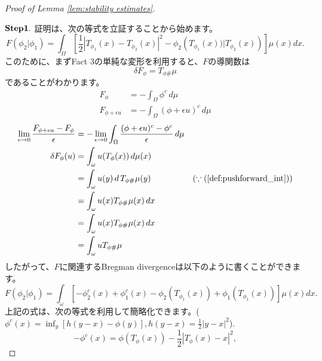 \documentclass{jsarticle}
\theoremstyle{definition}
\begin{document}
\begin{proof}[Proof of Lemma \ref{lem:stability estimates}]
  \hypertarget{proof:lem:stability estimates}{}

  $\bold{Step 1.}$
  証明は、次の等式を立証することから始めます。
  \begin{equation}
    \label{eq:F(phi2|phi1)}
    F(\phi_2 | \phi_1) = \int_{\Omega} \left[\frac{1}{2} \left| T_{\phi_1}(x) - T_{\phi_2}(x) \right|^2 - \phi_2\left( T_{\phi_1}(x)) |T_{\phi_2}(x)\right) \right] \mu(x)dx.
  \end{equation}
  このために、まずFact 3の単純な変形を利用すると、$F$の導関数は
  \begin{equation}
    \label{eq:delta F}
    \delta F_\phi = T_{\phi \#} \mu
  \end{equation}  
  であることがわかります。
  \begin{align*}
    F_\phi &= - \int_\Omega \phi^c \, d \mu\\
    F_{\phi + \epsilon u} &= - \int_\Omega (\phi + \epsilon u)^c \, d \mu
  \end{align*}
  \begin{align*}
    \lim_{\epsilon \to 0} \frac{F_{\phi + \epsilon u} - F_\phi}{\epsilon} &= - \lim_{\epsilon \to 0} \int_\Omega \frac{(\phi + \epsilon u)^c -  \phi^c}{\epsilon} \, d \mu\\
                                                          \delta F_\phi(u) &= \int_\omega u(T_\phi(x)) \, d\mu(x) \\
                                                                          &= \int_\omega u(y) \, d\, T_{\phi \#} \mu(y) & (\because (\ref{def:pushforward_int}))\\
                                                                          &= \int_\omega u(x) T_{\phi \#} \mu(x) \, dx\\
                                                                          &= \int_\omega u(x) T_{\phi \#} \mu(x)\, dx\\
                                                                          &= \int_\omega u T_{\phi \#} \mu
  \end{align*}
  したがって、$F$に関連するBregman divergenceは以下のように書くことができます。
  \[
    F(\phi_2 | \phi_1) = \int_{\omega} \left[-\phi_2^c(x) + \phi_1^c(x) - \phi_2(T_{\phi_1}(x)) + \phi_1(T_{\phi_1}(x))\right] \mu(x)dx.
  \]
  上記の式は、次の等式を利用して簡略化できます。($\phi^c(x) = \inf_y \left[h(y - x) - \phi(y) \right], h(y - x) = \frac{1}{2}|y-x|^2$).
  \[
    -\phi^c(x) = \phi(T_{\phi}(x)) - \frac{1}{2} \left|T_{\phi}(x) - x\right|^2,
\]
\end{proof}
\end{document}

